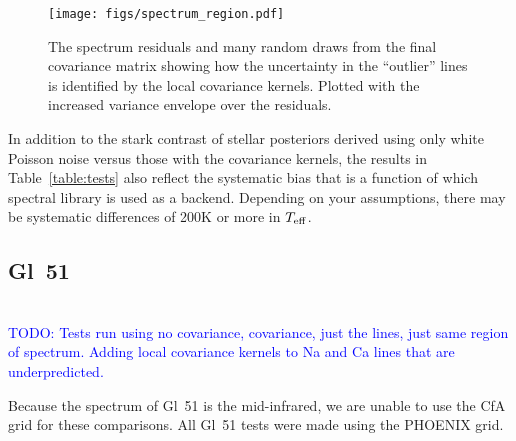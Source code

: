 \documentclass[iop,floatfix]{emulateapj}
\newcommand{\todo}[1]{ \textcolor{blue}{\\TODO: #1}}
\begin{document}
\begin{figure}[!htb]
\begin{center}
  \texttt{[image: figs/spectrum\_region.pdf]}
  \caption{The spectrum residuals and many random draws from the final covariance matrix showing how the uncertainty in the ``outlier'' lines is identified by the local covariance kernels. Plotted with the increased variance envelope over the residuals.
}
\label{fig:regions}
\end{center}
\end{figure}

In addition to the stark contrast of stellar posteriors derived using only white Poisson noise versus those with the covariance kernels, the results in Table~\ref{table:tests} also reflect the systematic bias that is a function of which spectral library is used as a backend. Depending on your assumptions, there may be systematic differences of 200K or more in $T_{\rm eff}$. 

\subsection{Gl~51}
\todo{Tests run using no covariance, covariance, just the lines, just same region of spectrum. Adding local covariance kernels to Na and Ca lines that are underpredicted.}

Because the spectrum of Gl~51 is the mid-infrared, we are unable to use the CfA grid for these comparisons. All Gl~51 tests were made using the PHOENIX grid.
\end{document}
